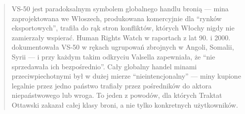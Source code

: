 \documentclass[12pt,openany,oneside]{book}
\begin{document}
\begin{quote}
VS-50 jest paradoksalnym symbolem globalnego handlu bronią --- mina
zaprojektowana we Włoszech, produkowana komercyjnie dla ``rynków
eksportowych'', trafiła do rąk stron konfliktów, których Włochy nigdy
nie zamierzały wspierać. Human Rights Watch w raportach z lat 90. i
2000. dokumentowała VS-50 w rękach ugrupowań zbrojnych w Angoli,
Somalii, Syrii --- i przy każdym takim odkryciu Valsella zapewniała, że
``nie sprzedawała ich bezpośrednio''. Cały globalny handel minami
przeciwpiechotnymi był w dużej mierze ``nieintencjonalny'' --- miny
kupione legalnie przez jedno państwo trafiały przez pośredników do
aktora niepaństwowego lub wroga. To jeden z powodów, dla których Traktat
Ottawski zakazał całej klasy broni, a nie tylko konkretnych
użytkowników.
\end{quote}
\end{document}
